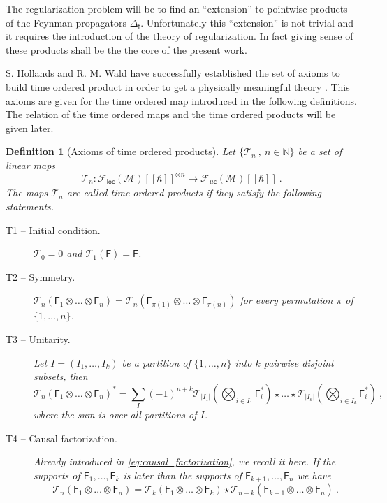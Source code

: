 \documentclass[11pt]{book}
\newcommand{\loc}{\mathsf{loc}}
\newcommand{\muc}{\mu\csf}
\newcommand{\abs}[1]{\left|#1\right|}
\newcommand{\Fcal}{\mathcal{F}}
\newcommand{\Mcal}{\mathcal{M}}
\newcommand{\Tcal}{\mathcal{T}}
\newcommand{\Nbb}{\mathbb{N}}
\newcommand{\Fsf}{\mathsf{F}}
\newcommand{\csf}{\mathsf{c}}
\newcommand{\fsf}{\mathsf{f}}
\theoremstyle{break}
\newtheorem{definition}{Definition}[chapter]
\begin{document}
The regularization problem will be to find an ``extension'' to pointwise products of the Feynman propagators $\Delta_\fsf$. Unfortunately this ``extension'' is not trivial and it requires the introduction of the theory of regularization. In fact giving sense of these products shall be the the core of the present work.


\bigskip


S. Hollands and R. M. Wald have successfully established the set of axioms to build time ordered product in order to get a physically meaningful theory \cite{HW_2001,HW_2002}. This axioms are given for the time ordered map introduced in the following definitions. The relation of the time ordered maps and the time ordered products will be given later.


\begin{definition}[Axioms of time ordered products]
Let $\{\Tcal_n \ , \ n \in \Nbb\}$ be a set of linear maps 
%
\begin{equation*}
\Tcal_n : \Fcal_\loc(\Mcal)[[\hbar]]^{\otimes n} \to \Fcal_{\muc}(\Mcal)[[\hbar]] \ . 
\end{equation*}
%
The maps $\Tcal_n$ are called time ordered products if they satisfy the following statements.
%
\begin{description}
\item[T1 -- Initial condition.]\label{item:T1} $\Tcal_0 = 0$ and $\Tcal_1(\Fsf) = \Fsf$.
%
\item[T2 -- Symmetry.]\label{item:T2} $\Tcal_n(\Fsf_1\otimes\dots\otimes\Fsf_n) = \Tcal_n(\Fsf_{\pi(1)}\otimes\dots\otimes\Fsf_{\pi(n)})$ for every permutation $\pi$ of $\{1,\dots,n\}$.
%
\item[T3 -- Unitarity.]\label{item:T3} Let $I=(I_1,\dots,I_k)$ be a partition of $\{1,\dots,n\}$ into $k$ pairwise disjoint subsets, then
%
\begin{equation*}
\Tcal_n(\Fsf_1\otimes\dots\otimes\Fsf_n)^\ast = \sum_{I} (-1)^{n+k} \Tcal_{\abs{I_1}}\left(\bigotimes_{i\in I_1} \Fsf_i^\ast \right) \star \dots \star \Tcal_{\abs{I_k}}\left(\bigotimes_{i\in I_k} \Fsf_i^\ast \right) \ ,
\end{equation*}
%
where the sum is over all partitions of $I$.
%
\item[T4 -- Causal factorization.]\label{item:T4} Already introduced in \eqref{eq:causal_factorization}, we recall it here. If the supports of $\Fsf_1,\dots,\Fsf_k$ is later than the supports of $\Fsf_{k+1} , \dots , \Fsf_{n}$ we have
\begin{equation*}
\Tcal_n(\Fsf_1\otimes\dots\otimes\Fsf_n) = \Tcal_k(\Fsf_1\otimes\dots\otimes\Fsf_k) \star \Tcal_{n-k} (\Fsf_{k+1}\otimes\dots\otimes\Fsf_n) \ .

\end{equation*}
\end{description}
\end{definition}
\end{document}
